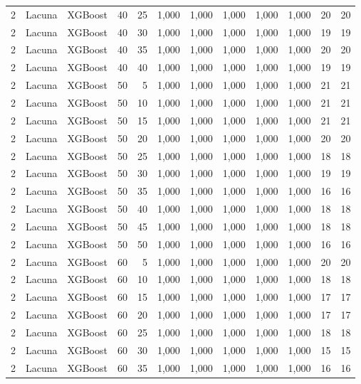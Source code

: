 \begin{longtable}{ccclrrrrrrrr}
2 & Lacuna & XGBoost & 40 & 25 & 1,000 & 1,000 & 1,000 & 1,000 & 1,000 & 20 & 20 \\
2 & Lacuna & XGBoost & 40 & 30 & 1,000 & 1,000 & 1,000 & 1,000 & 1,000 & 19 & 19 \\
2 & Lacuna & XGBoost & 40 & 35 & 1,000 & 1,000 & 1,000 & 1,000 & 1,000 & 20 & 20 \\
2 & Lacuna & XGBoost & 40 & 40 & 1,000 & 1,000 & 1,000 & 1,000 & 1,000 & 19 & 19 \\
2 & Lacuna & XGBoost & 50 & 5 & 1,000 & 1,000 & 1,000 & 1,000 & 1,000 & 21 & 21 \\
2 & Lacuna & XGBoost & 50 & 10 & 1,000 & 1,000 & 1,000 & 1,000 & 1,000 & 21 & 21 \\
2 & Lacuna & XGBoost & 50 & 15 & 1,000 & 1,000 & 1,000 & 1,000 & 1,000 & 21 & 21 \\
2 & Lacuna & XGBoost & 50 & 20 & 1,000 & 1,000 & 1,000 & 1,000 & 1,000 & 20 & 20 \\
2 & Lacuna & XGBoost & 50 & 25 & 1,000 & 1,000 & 1,000 & 1,000 & 1,000 & 18 & 18 \\
2 & Lacuna & XGBoost & 50 & 30 & 1,000 & 1,000 & 1,000 & 1,000 & 1,000 & 19 & 19 \\
2 & Lacuna & XGBoost & 50 & 35 & 1,000 & 1,000 & 1,000 & 1,000 & 1,000 & 16 & 16 \\
2 & Lacuna & XGBoost & 50 & 40 & 1,000 & 1,000 & 1,000 & 1,000 & 1,000 & 18 & 18 \\
2 & Lacuna & XGBoost & 50 & 45 & 1,000 & 1,000 & 1,000 & 1,000 & 1,000 & 18 & 18 \\
2 & Lacuna & XGBoost & 50 & 50 & 1,000 & 1,000 & 1,000 & 1,000 & 1,000 & 16 & 16 \\
2 & Lacuna & XGBoost & 60 & 5 & 1,000 & 1,000 & 1,000 & 1,000 & 1,000 & 20 & 20 \\
2 & Lacuna & XGBoost & 60 & 10 & 1,000 & 1,000 & 1,000 & 1,000 & 1,000 & 18 & 18 \\
2 & Lacuna & XGBoost & 60 & 15 & 1,000 & 1,000 & 1,000 & 1,000 & 1,000 & 17 & 17 \\
2 & Lacuna & XGBoost & 60 & 20 & 1,000 & 1,000 & 1,000 & 1,000 & 1,000 & 17 & 17 \\
2 & Lacuna & XGBoost & 60 & 25 & 1,000 & 1,000 & 1,000 & 1,000 & 1,000 & 18 & 18 \\
2 & Lacuna & XGBoost & 60 & 30 & 1,000 & 1,000 & 1,000 & 1,000 & 1,000 & 15 & 15 \\
2 & Lacuna & XGBoost & 60 & 35 & 1,000 & 1,000 & 1,000 & 1,000 & 1,000 & 16 & 16 \\

\end{longtable}
